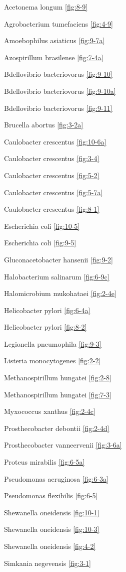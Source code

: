 \documentclass[]{tufte-book}
\begin{document}
Acetonema longum \ref{fig:8-9}

Agrobacterium tumefaciens \ref{fig:4-9}

Amoebophilus asiaticus \ref{fig:9-7a}

Azospirillum brasilense \ref{fig:7-4a}

Bdellovibrio bacteriovorus \ref{fig:9-10}

Bdellovibrio bacteriovorus \ref{fig:9-10a}

Bdellovibrio bacteriovorus \ref{fig:9-11}

Brucella abortus \ref{fig:3-2a}

Caulobacter crescentus \ref{fig:10-6a}

Caulobacter crescentus \ref{fig:3-4}

Caulobacter crescentus \ref{fig:5-2}

Caulobacter crescentus \ref{fig:5-7a}

Caulobacter crescentus \ref{fig:8-1}

Escherichia coli \ref{fig:10-5}

Escherichia coli \ref{fig:9-5}

Gluconacetobacter hansenii \ref{fig:9-2}

Halobacterium salinarum \ref{fig:6-9c}

Halomicrobium mukohataei \ref{fig:2-4e}

Helicobacter pylori \ref{fig:6-4a}

Helicobacter pylori \ref{fig:8-2}

Legionella pneumophila \ref{fig:9-3}

Listeria monocytogenes \ref{fig:2-2}

Methanospirillum hungatei \ref{fig:2-8}

Methanospirillum hungatei \ref{fig:7-3}

Myxococcus xanthus \ref{fig:2-4c}

Prosthecobacter debontii \ref{fig:2-4d}

Prosthecobacter vanneervenii \ref{fig:3-6a}

Proteus mirabilis \ref{fig:6-5a}

Pseudomonas aeruginosa \ref{fig:6-3a}

Pseudomonas flexibilis \ref{fig:6-5}

Shewanella oneidensis \ref{fig:10-1}

Shewanella oneidensis \ref{fig:10-3}

Shewanella oneidensis \ref{fig:4-2}

Simkania negevensis \ref{fig:3-1}
\end{document}
